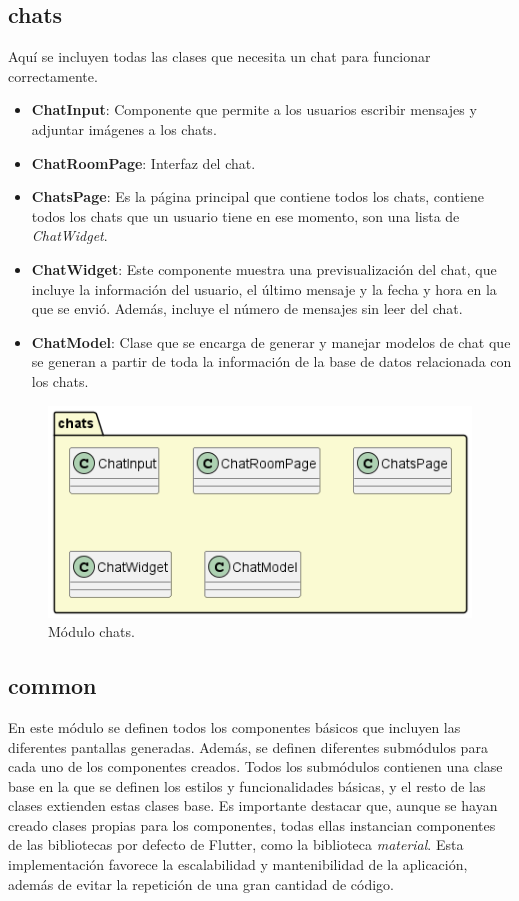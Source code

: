 \documentclass[a4paper, 12pt]{article}
\begin{document}
\subsection*{chats}

Aquí se incluyen todas las clases que necesita un chat para funcionar correctamente.
\begin{itemize}[noitemsep]
	\item \textbf{ChatInput}: Componente que permite a los usuarios escribir mensajes y adjuntar imágenes a los chats.
	\item \textbf{ChatRoomPage}: Interfaz del chat.
	\item \textbf{ChatsPage}:  Es la página principal que contiene todos los chats, contiene todos los chats que un usuario tiene en ese momento, son una lista de \textit{ChatWidget}.
	\item \textbf{ChatWidget}: Este componente muestra una previsualización del chat, que incluye la información del usuario, el último mensaje y  la fecha y hora en la que se envió. Además, incluye el número de mensajes sin leer del chat.
	\item \textbf{ChatModel}: Clase que se encarga de generar y manejar modelos de chat que se generan a partir de toda la información de la base de datos relacionada con los chats.
\end{itemize}

\begin{figure}[H]
	\begin{center}
		{\includegraphics[width=0.7\linewidth]{diagram/Chats.png}\par}
		\caption{Módulo chats.}
	\end{center}
\end{figure}


\subsection*{common}

En este módulo se definen todos los componentes básicos que incluyen las diferentes pantallas generadas. Además, se definen diferentes submódulos para cada uno de los componentes creados. Todos los submódulos contienen una clase base en la que se definen los estilos y funcionalidades básicas, y el resto de las clases extienden estas clases base. Es importante destacar que, aunque se hayan creado clases propias para los componentes, todas ellas instancian componentes de las bibliotecas por defecto de Flutter, como la biblioteca \textit{material}. Esta implementación favorece la escalabilidad y mantenibilidad de la aplicación, además de evitar la repetición de una gran cantidad de código.
\end{document}
